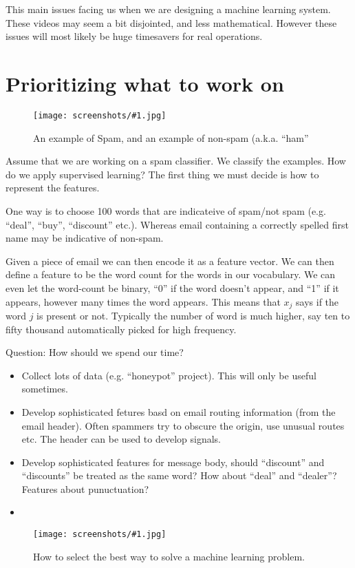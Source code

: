 \documentclass[a4, 12pt, english, USenglish]{scrreprt}
\newcommand{\screenshot}[2]{
\begin{figure}[htb]
\texttt{[image: screenshots/\#1.jpg]}
\label{#1}
\caption{#2}
\end{figure}}
\begin{document}
This main issues facing us when we are designing a machine learning
system.   These videos may seem a bit disjointed, and less
mathematical.    However these issues will most likely be huge
timesavers for real operations.

\section{Prioritizing what to work on}

\screenshot{spamnospam}{An example of Spam, and an example of non-spam
(a.k.a. ``ham''}

Assume that we are working on a spam classifier.    We classify the
examples. How do we apply supervised learning?     The first thing we
must decide is how to represent the features.  

One way is to choose 100 words that are indicateive of spam/not spam
(e.g. ``deal'', ``buy'', ``discount'' etc.).   Whereas email
containing a correctly spelled first name may be indicative of
non-spam.

Given a piece of email we can then encode it as a feature vector.  We
can then define a feature to be the word count for the words in our
vocabulary. We can even let the word-count be binary, ``0'' if the
word doesn't appear, and ``1'' if it appears, however many times the
word appears.  This means that \(x_j\) says if the word \(j\) is
present or not.  Typically the number of word is much higher, say  ten
to fifty thousand automatically picked for high frequency.

Question: How should we spend our time?

\begin{itemize}
\item Collect lots of data (e.g. ``honeypot'' project).  This will
  only be useful sometimes.
\item Develop sophisticated fetures basd on email routing information
  (from the email header).  Often spammers try to obscure the origin,
use unusual routes etc.  The header can be
used to develop signals.
\item Develop sophisticated features for message body, should
  ``discount'' and ``discounts'' be treated as the same word? How
  about ``deal'' and ``dealer''? Features about punuctuation?
\item 
\end{itemize}

\screenshot{quizzzz}{How to select the best way to solve a machine
  learning problem.}
\end{document}
